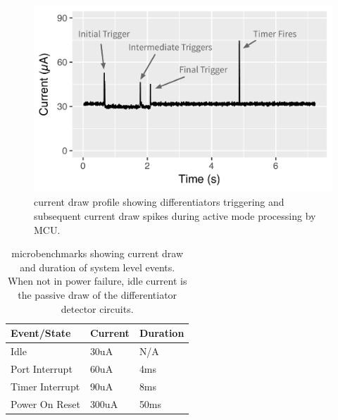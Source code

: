 \begin{figure}[t]
    \includegraphics[width=\columnwidth]{figs/profile_final.pdf}
    \caption{ \sysname current draw profile showing differentiators triggering and subsequent current draw spikes during active mode processing by MCU.}
    \label{fig:currentprofile}
\end{figure}

\begin{table}[t]
	\begin{tabular}{@{}p{1.3in}p{0.8in}p{0.8in}@{}}
	\toprule
	\textbf{Event/State} & \textbf{Current} & \textbf{Duration} \\ \midrule
	Idle & 30uA & N/A \\
	Port Interrupt & 60uA & 4ms \\
	Timer Interrupt & 90uA & 8ms \\
	Power On Reset & 300uA & 50ms \\
	\bottomrule
	\end{tabular}
	\caption{\sysname microbenchmarks showing current draw and duration of system level events. When not in power failure, idle current is the passive draw of the differentiator detector circuits.  \label{tab:microbench}}
\end{table}








